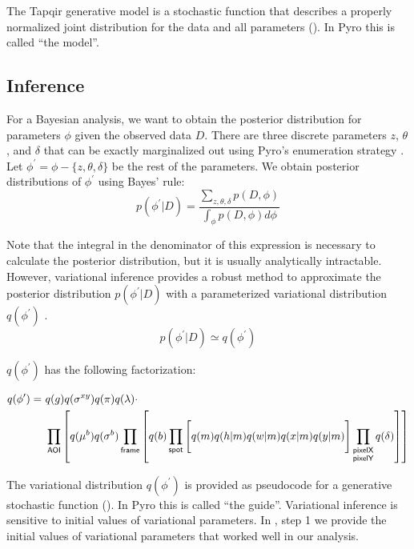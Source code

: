 The Tapqir generative model is a stochastic function that describes a properly normalized joint distribution for the data and all parameters (). In Pyro this is called ``the model''.
 


\subsection{Inference}

For a Bayesian analysis, we want to obtain the posterior distribution for parameters $\phi$ given the observed data $D$. There are three discrete parameters $z$, $\theta$, and $\delta$ that can be exactly marginalized out using Pyro's enumeration strategy \citep{Obermeyer2019-xt}. Let $\phi^{\prime} = \phi - \{ z, \theta, \delta \}$ be the rest of the parameters. We obtain posterior distributions of $\phi^{\prime}$ using Bayes' rule:
%
\begin{equation}
    p(\phi^{\prime} | D) =
    \dfrac{\sum_{z, \theta, \delta} p(D, \phi)}{\int_{\phi} p(D, \phi) d\phi}
\end{equation}

Note that the integral in the denominator of this expression is necessary to calculate the posterior distribution, but it is usually analytically intractable. However, variational inference provides a robust method to approximate the posterior distribution $p(\phi^{\prime} | D)$ with a parameterized variational distribution $q(\phi^{\prime})$ \citep{Bishop2006-oa}.
%
\begin{equation}
    p(\phi^{\prime} | D) \simeq q(\phi^{\prime})
\end{equation}


$q(\phi^{\prime})$ has the following factorization:

\begin{equation}
\begin{aligned}
    q(\phi^{\prime}) =~&q(g) q(\sigma^{xy}) q(\pi) q(\lambda) \cdot \\
    &\prod_{\mathsf{AOI}} \left[ q(\mu^b) q(\sigma^b) \prod_{\mathsf{frame}} \left[ q(b) \prod_{\mathsf{spot}} \left[ \vphantom{\prod_{F}} q(m) q(h | m) q(w | m) q(x | m) q(y | m) \right] \prod_{\substack{\mathsf{pixelX} \\ \mathsf{pixelY}}} q(\delta) \right] \right]
\end{aligned}
\end{equation}

The variational distribution $q(\phi^{\prime})$ is provided as pseudocode for a generative stochastic function (). In Pyro this is called ``the guide''. Variational inference is sensitive to initial values of variational parameters. In , step 1 we provide the initial values of variational parameters that worked well in our analysis.

